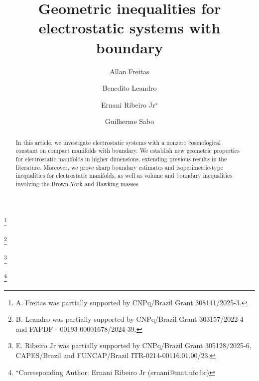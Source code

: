 \documentclass{amsart}
\numberwithin{equation}{section}
\begin{document}
	
	\title[Geometric Inequalities for electrostatic systems]{Geometric inequalities for\\ electrostatic systems with boundary}
	
	
	\author{Allan Freitas}
	\address[A. Freitas]{Universidade Federal da Para\'iba - UFPB, Departamento de Matem\'{a}tica, Jo\~ao Pessoa - PB, 58051-900, Brazil} 
	\curraddr{}
	\thanks{A. Freitas was partially supported by CNPq/Brazil Grant 308141/2025-3.}
	
	\author{Benedito Leandro}
	\address[B. Leandro]{Universidade de Bras\'ilia - UNB, Departamento de Matem\'{a}tica, Bras\'ilia - DF, 70910-900, Brazil} 
	\curraddr{}
	\thanks{B. Leandro was partially supported by CNPq/Brazil Grant 303157/2022-4 and FAPDF - 00193-00001678/2024-39.}
	
	\author{Ernani Ribeiro Jr$^{\star}$}
	\address[E. Ribeiro Jr]{Universidade Federal do Cear\'a - UFC, Departamento  de Matem\'atica, Campus do Pici, Av. Humberto Monte, Bloco 914, 60455-760, Fortaleza - CE, Brazil}
	\curraddr{}
	\thanks{E. Ribeiro Jr was partially supported by CNPq/Brazil Grant 305128/2025-6, CAPES/Brazil and FUNCAP/Brazil ITR-0214-00116.01.00/23.}
	
	\author{Guilherme Sabo}
	\address[G. Sabo]{Universidade de Bras\'ilia - UNB, Departamento de Matem\'{a}tica, Bras\'ilia - DF, 70910-900, Brazil}
	\curraddr{}

	
	
	\thanks{$^{\star}$Corresponding Author: Ernani Ribeiro Jr (ernani@mat.ufc.br)}
	
	
  

	
	
	\dedicatory{}
	
	\begin{abstract}
In this article, we investigate electrostatic systems with a nonzero cosmological constant on compact manifolds with boundary. We establish new geometric pro\-per\-ties for electrostatic manifolds in higher dimensions, extending previous results in the literature. Moreover, we prove sharp boundary estimates and isoperimetric-type inequa\-li\-ties for electrostatic manifolds, as well as volume and boundary inequalities involving the Brown-York and Hawking masses.
	\end{abstract}
	
\end{document}
